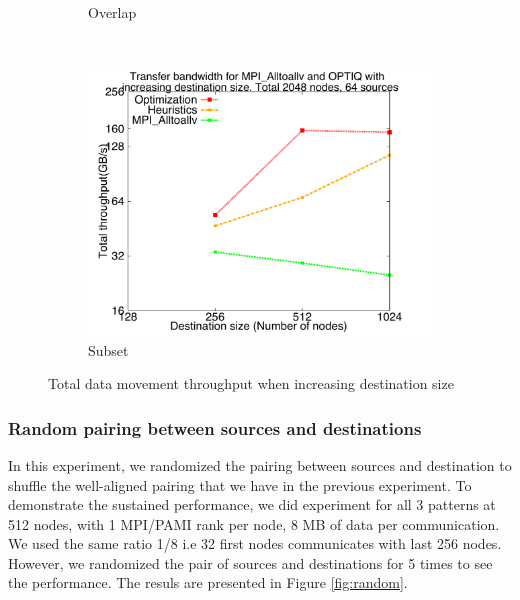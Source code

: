 \begin{figure}[!htbp]
\begin{subfigure}[b]{0.32\textwidth}
                \caption{Overlap}
                \label{fig:incrsize_overlap}
        \end{subfigure}
        ~ %
        \begin{subfigure}[b]{0.32\textwidth}
                \includegraphics[width=\textwidth]{figures/incrsize_subset}
                \caption{Subset}
                \label{fig:incrsize_subset}
        \end{subfigure}
        \caption{Total data movement throughput when increasing destination size}
        \label{fig:incrsize}
\end{figure}

\subsubsection{Random pairing between sources and destinations}

In this experiment, we randomized the pairing between sources and destination to shuffle the well-aligned pairing that we have in the previous experiment. To demonstrate the sustained performance, we did experiment for all 3 patterns at 512 nodes, with 1 MPI/PAMI rank per node, 8 MB of data per communication. We used the same ratio 1/8 i.e 32 first nodes communicates with last 256 nodes. However, we randomized the pair of sources and destinations for 5 times to see the performance. The resuls are presented in Figure \ref{fig:random}.

